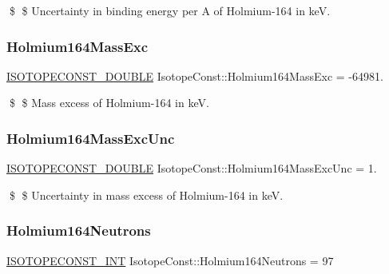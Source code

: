 \$ \$ Uncertainty in binding energy per A of Holmium-\/164 in keV. \mbox{\label{group___isotope_const-_holmium-_ho164_ga975f45cb966a2b1b5cfe98a9e47276fd}} 
\subsubsection{\texorpdfstring{Holmium164\+Mass\+Exc}{Holmium164MassExc}}
{\footnotesize\ttfamily \mbox{\hyperlink{group___isotope_const-_macros_ga8f45a7272ce02c0b4c65c44636ed719a}{I\+S\+O\+T\+O\+P\+E\+C\+O\+N\+S\+T\+\_\+\+D\+O\+U\+B\+LE}} Isotope\+Const\+::\+Holmium164\+Mass\+Exc = -\/64981.}

\$ \$ Mass excess of Holmium-\/164 in keV. \mbox{\label{group___isotope_const-_holmium-_ho164_gaa0175a4af368c178eb4836456f08eb2f}} 
\subsubsection{\texorpdfstring{Holmium164\+Mass\+Exc\+Unc}{Holmium164MassExcUnc}}
{\footnotesize\ttfamily \mbox{\hyperlink{group___isotope_const-_macros_ga8f45a7272ce02c0b4c65c44636ed719a}{I\+S\+O\+T\+O\+P\+E\+C\+O\+N\+S\+T\+\_\+\+D\+O\+U\+B\+LE}} Isotope\+Const\+::\+Holmium164\+Mass\+Exc\+Unc = 1.}

\$ \$ Uncertainty in mass excess of Holmium-\/164 in keV. \mbox{\label{group___isotope_const-_holmium-_ho164_gad93f47399b1d3e6dc9628c0e2c81711a}} 
\subsubsection{\texorpdfstring{Holmium164\+Neutrons}{Holmium164Neutrons}}
{\footnotesize\ttfamily \mbox{\hyperlink{group___isotope_const-_macros_ga5f18360b3e99483a35c32d789e62621c}{I\+S\+O\+T\+O\+P\+E\+C\+O\+N\+S\+T\+\_\+\+I\+NT}} Isotope\+Const\+::\+Holmium164\+Neutrons = 97}

